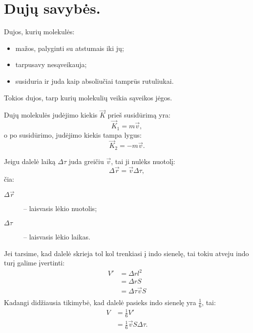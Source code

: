 \section{Dujų savybės.}

\begin{defn}
  Dujos, kurių molekulės:
  \begin{itemize}
    \item mažos, palyginti su atstumais iki jų;
    \item tarpusavy nesąveikauja;
    \item susiduria ir juda kaip absoliučiai tamprūs rutuliukai.
  \end{itemize}
\end{defn}

\begin{defn}
  Tokios dujos, tarp kurių molekulių veikia sąveikos jėgos.
\end{defn}

Dujų molekulės judėjimo kiekis $\vec{K}$ prieš susidūrimą yra:
\begin{equation}
  \vec{K}_{1} = m \vec{v},
  \label{eq:dujos_K1}
\end{equation}
o po susidūrimo, judėjimo kiekis tampa lygus:
\begin{equation}
  \vec{K}_{2} = - m \vec{v}.
  \label{eq:dujos_K2}
\end{equation}

Jeigu dalelė laiką $\Delta \tau$ juda greičiu $\vec{v}$, tai ji
nulėks nuotolį:
\begin{equation*}
  \Delta \vec{r} = \vec{v} \Delta \tau,
\end{equation*}
čia:
\begin{description}
  \item[$\Delta \vec{r}$] – laisvasis lėkio nuotolis;
  \item[$\Delta \tau$] – laisvasis lėkio laikas.
\end{description}

Jei tarsime, kad dalelė skrieja tol kol trenkiasi į indo sienelę, tai
tokiu atveju indo turį galime įvertinti:
\begin{align*}
  V'
  &= \Delta r l^{2} \\
  &= \Delta r S \\
  &= \Delta \tau \vec{v} S \\
\end{align*}
Kadangi didžiausia tikimybė, kad dalelė pasieks indo sienelę yra
$\frac{1}{6}$, tai:
\begin{align*}
  V
  &= \frac{1}{6} V' \\
  &= \frac{1}{6} \vec{v} S \Delta \tau. \\
\end{align*}

